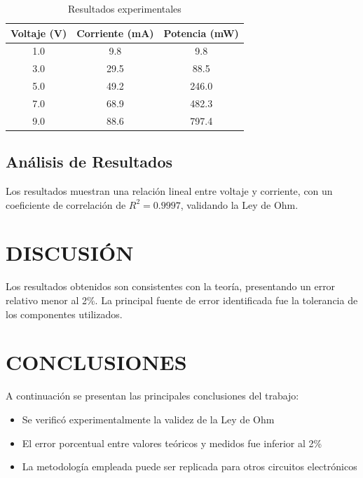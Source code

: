 \documentclass[conference, letterpaper, 10pt]{IEEEtran}
\begin{document}
\begin{table}[H]
    \centering
    \caption{Resultados experimentales}
    \begin{tabular}{@{}ccc@{}}
        \toprule
        \textbf{Voltaje (V)} & \textbf{Corriente (mA)} & \textbf{Potencia (mW)} \\
        \midrule
        1.0 & 9.8 & 9.8 \\
        3.0 & 29.5 & 88.5 \\
        5.0 & 49.2 & 246.0 \\
        7.0 & 68.9 & 482.3 \\
        9.0 & 88.6 & 797.4 \\
        \bottomrule
    \end{tabular}
    \label{tab:resultados}
\end{table}

\subsection{Análisis de Resultados}
Los resultados muestran una relación lineal entre voltaje y corriente, con un coeficiente de correlación de $R^2 = 0.9997$, validando la Ley de Ohm.

\section{DISCUSIÓN}

Los resultados obtenidos son consistentes con la teoría, presentando un error relativo menor al 2\%. La principal fuente de error identificada fue la tolerancia de los componentes utilizados.

\section{CONCLUSIONES}

A continuación se presentan las principales conclusiones del trabajo:

\begin{itemize}
    \item Se verificó experimentalmente la validez de la Ley de Ohm
    \item El error porcentual entre valores teóricos y medidos fue inferior al 2\%
    \item La metodología empleada puede ser replicada para otros circuitos electrónicos
\end{itemize}
\end{document}
